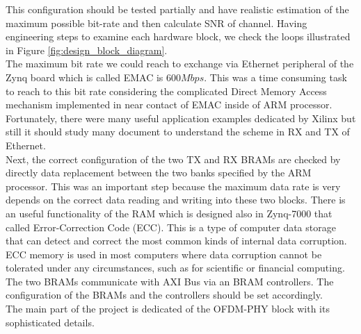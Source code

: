 This configuration should be tested partially and have realistic estimation of the maximum possible bit-rate and then calculate SNR of channel. Having engineering steps to examine each hardware block, we check the loops illustrated in Figure \ref{fig:design_block_diagram}.\\
The maximum bit rate we could reach to exchange via Ethernet peripheral of the Zynq board which is called EMAC is $600 Mbps$. This was a time consuming task to reach to this bit rate considering the complicated Direct Memory Access mechanism implemented in near contact of EMAC inside of ARM processor. Fortunately, there were many useful application examples dedicated by Xilinx but still it should study many document to understand the scheme in RX and TX of Ethernet.\\
Next, the correct configuration of the two TX and RX BRAMs are checked by directly data replacement between the two banks specified by the ARM processor. This was an important step because the maximum data rate is very depends on the correct data reading and writing into these two blocks. There is an useful functionality of the RAM which is designed also in Zynq-7000 that called Error-Correction Code (ECC). This is a type of computer data storage that can detect and correct the most common kinds of internal data corruption. ECC memory is used in most computers where data corruption cannot be tolerated under any circumstances, such as for scientific or financial computing. The two BRAMs communicate with AXI Bus via an BRAM controllers. The configuration of the BRAMs and the controllers should be set accordingly.\\
The main part of the project is dedicated of the OFDM-PHY block with its sophisticated details.\\
